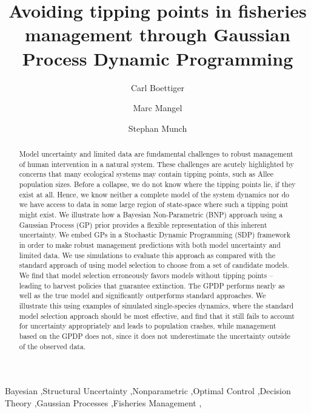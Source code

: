 \documentclass[author-year, 12pt,review]{components/elsarticle} %
\begin{document}
\begin{frontmatter}

  \title{Avoiding tipping points in fisheries management through Gaussian Process
Dynamic Programming}
    \author[cstar]{Carl Boettiger}
    \author[cstar]{Marc Mangel}
  
  
    \author[noaa]{Stephan Munch}
  
  
      \address[cstar]{Center for Stock Assessment Research, Department of Applied Math and
Statistics, University of California, Mail Stop SOE-2, Santa Cruz, CA
95064, USA}    
    \address[noaa]{Southwest Fisheries Science Center, National Oceanic and Atmospheric
Administration, 110 Shaffer Road, Santa Cruz, CA 95060, USA}    
  
  \begin{abstract}
  Model uncertainty and limited data are fundamental challenges to robust
  management of human intervention in a natural system. These challenges
  are acutely highlighted by concerns that many ecological systems may
  contain tipping points, such as Allee population sizes. Before a
  collapse, we do not know where the tipping points lie, if they exist at
  all. Hence, we know neither a complete model of the system dynamics nor
  do we have access to data in some large region of state-space where such
  a tipping point might exist. We illustrate how a Bayesian Non-Parametric
  (BNP) approach using a Gaussian Process (GP) prior provides a flexible
  representation of this inherent uncertainty. We embed GPs in a
  Stochastic Dynamic Programming (SDP) framework in order to make robust
  management predictions with both model uncertainty and limited data. We
  use simulations to evaluate this approach as compared with the standard
  approach of using model selection to choose from a set of candidate
  models. We find that model selection erroneously favors models without
  tipping points -- leading to harvest policies that guarantee extinction.
  The GPDP performs nearly as well as the true model and significantly
  outperforms standard approaches. We illustrate this using examples of
  simulated single-species dynamics, where the standard model selection
  approach should be most effective, and find that it still fails to
  account for uncertainty appropriately and leads to population crashes,
  while management based on the GPDP does not, since it does not
  underestimate the uncertainty outside of the observed data.
  \end{abstract}
   \begin{keyword} Bayesian \sep Structural Uncertainty \sep Nonparametric \sep Optimal Control \sep Decision Theory \sep Gaussian Processes \sep Fisheries Management \sep \end{keyword}
 \end{frontmatter}
\end{document}
